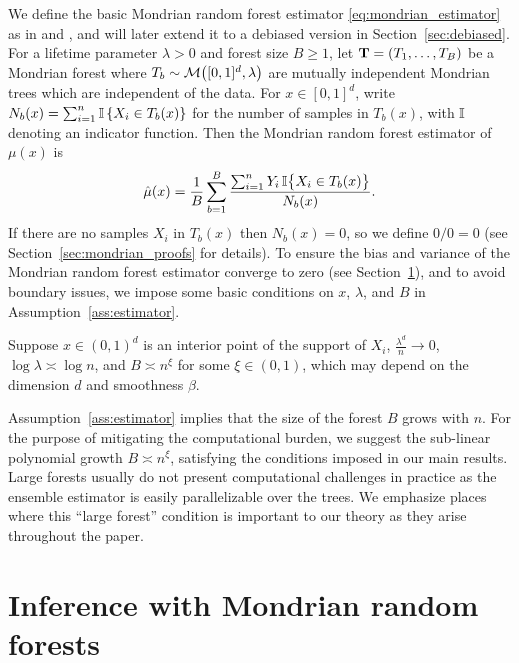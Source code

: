 We define the basic Mondrian random forest estimator
\eqref{eq:mondrian_estimator}
as in \citet{lakshminarayanan2014mondrian} and
\citet{mourtada2020minimax},
and will later extend it to a debiased version
in Section~\ref{sec:debiased}.
For a lifetime parameter $\lambda > 0$ and
forest size $B \geq 1$,
let $\mathbf{T} = (T_1, \ldots, T_B)$ be a Mondrian forest
where $T_b \sim \mathcal{M}\big([0,1]^d, \lambda\big)$ are
mutually independent Mondrian trees which are
independent of the data.
For $x \in [0,1]^d$, write
$N_b(x) = \sum_{i=1}^{n} \mathbb{I} \left\{ X_i \in T_b(x) \right\}$
for the number of samples in $T_b(x)$,
with $\mathbb{I}$ denoting an indicator function.
Then the Mondrian random forest estimator of $\mu(x)$ is
%
\begin{align}
  \label{eq:mondrian_estimator}
  \hat\mu(x)
  =
  \frac{1}{B}
  \sum_{b=1}^B
  \frac{\sum_{i=1}^n Y_i \, \mathbb{I}\big\{ X_i \in T_b(x) \big\}}
  {N_b(x)}.
\end{align}
%
If there are no samples $X_i$ in $T_b(x)$ then $N_b(x) = 0$,
so we define $0/0 = 0$
(see Section~\ref{sec:mondrian_proofs} for details).
To ensure the bias and variance of the Mondrian random forest estimator
converge to zero (see Section~\ref{sec:mondrian_inference}),
and to avoid boundary issues,
we impose some basic conditions on
$x$, $\lambda$, and $B$ in Assumption~\ref{ass:estimator}.

\begin{assumption}%
  \label{ass:estimator}
  Suppose $x \in (0,1)^d$ is an interior point of the support of $X_i$,
  $\frac{\lambda^d}{n} \to 0$,
  $\log \lambda \asymp \log n$,
  and $B \asymp n^{\xi}$ for some $\xi \in (0, 1)$,
  which may depend on the dimension $d$ and smoothness $\beta$.
\end{assumption}

Assumption~\ref{ass:estimator} implies that
the size of the forest $B$ grows with $n$.
For the purpose of mitigating the computational burden,
we suggest the sub-linear polynomial growth $B \asymp n^{\xi}$,
satisfying the conditions imposed in our main results.
Large forests usually do not present computational challenges in
practice as the ensemble estimator is easily parallelizable over the trees.
We emphasize places where this ``large forest'' condition is important
to our theory as they arise throughout the paper.

\section{Inference with Mondrian random forests}%
\label{sec:mondrian_inference}

